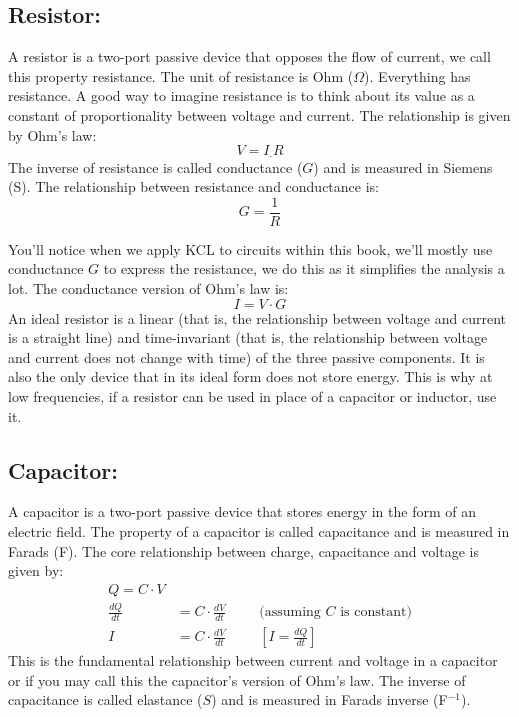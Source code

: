 \subsection{Resistor:}
A resistor is a two-port passive device that opposes the flow of current,
we call this property resistance. The unit of resistance is Ohm (\(\Omega\)).
Everything has resistance. A good way to imagine resistance is to
think about its value as a constant of proportionality between voltage
and current. The relationship is given by Ohm's law:
\[
  V = I_ \cdot R
\]
The inverse of resistance is called conductance (\(G\)) and is measured
in Siemens (S). The relationship between resistance and conductance is:
\[
  G = \frac{1}{R}
\]

You'll notice when we apply KCL to circuits within this book, we'll mostly
use conductance \(G\) to express the resistance, we do this as it
simplifies the analysis a lot. The conductance version of Ohm's law is:
\[
  I = V \cdot G
\]
An ideal resistor is a linear (that is, the relationship between voltage and
current is a straight line) and time-invariant (that is, the relationship
between voltage and current does not change with time) of the three passive
components. It is also the only device that in its ideal form does not
store energy. This is why at low frequencies, if a resistor can be used
in place of a capacitor or inductor, use it.

\subsection{Capacitor:}
A capacitor is a two-port passive device that stores energy in the form of
an electric field. The property of a capacitor is called capacitance and is
measured in Farads (F). The core relationship between charge, capacitance
and voltage is given by:
\begin{align*}
  Q = C \cdot V \\
  \frac{dQ}{dt} &= C \cdot \frac{dV}{dt} \hspace{1cm} \text{(assuming \(C\) is constant)} \\
  I &= C \cdot \frac{dV}{dt} \hspace{1cm} [I = \frac{dQ}{dt}]
\end{align*}
This is the fundamental relationship between current and voltage in a
capacitor or if you may call this the capacitor's version of Ohm's law.
The inverse of capacitance is called elastance (\(S\)) and is measured in Farads
inverse (F\(^{-1}\)).

